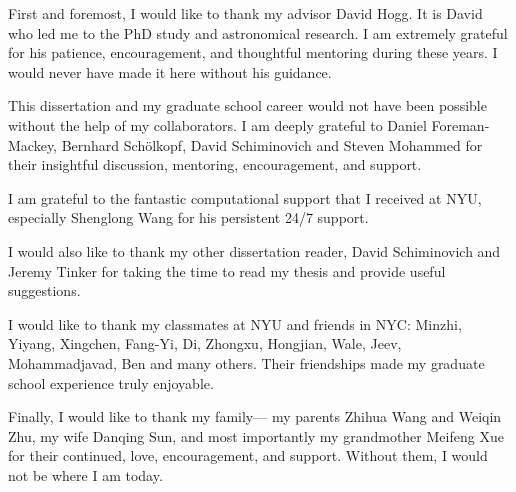 First and foremost, I would like to thank my advisor David Hogg.
It is David who led me to the PhD study and astronomical research.
I am extremely grateful for his patience, encouragement, and thoughtful mentoring during these years.
I would never have made it here without his guidance.

This dissertation and my graduate school career would not have been possible without the help of my collaborators.
I am deeply grateful to Daniel Foreman-Mackey, Bernhard Sch\"olkopf, David Schiminovich and Steven Mohammed for their insightful discussion, mentoring, encouragement, and support.

I am grateful to the fantastic computational support that I received at NYU, especially Shenglong Wang for his persistent 24/7 support.

I would also like to thank my other dissertation reader, David Schiminovich and Jeremy Tinker for taking the time to read my thesis and provide useful suggestions.

I would like to thank my classmates at NYU and friends in NYC:
Minzhi, Yiyang, Xingchen, Fang-Yi, Di, Zhongxu, Hongjian, Wale, Jeev, Mohammadjavad, Ben and many others.
Their friendships made my graduate school experience truly enjoyable.

Finally, I would like to thank my family---
my parents Zhihua Wang and Weiqin Zhu, 
my wife Danqing Sun, 
and most importantly my grandmother Meifeng Xue
for their continued, love, encouragement, and support.
Without them, I would not be where I am today.
